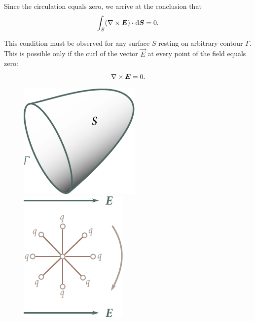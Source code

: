 \noindent
Since the circulation equals zero, we arrive at the conclusion that
\begin{equation*}
	\int_S (\nabla\times\boldsymbol{E}) \boldsymbol{\cdot} \mathrm{d}\boldsymbol{S} = 0.
\end{equation*}

\noindent
This condition must be observed for any surface $S$ resting on arbitrary contour $\Gamma$. This is possible only if the curl of the vector $\vec{E}$ at every point of the field equals zero:
\begin{equation}\label{eq:1_112}
	\nabla\times\boldsymbol{E} = 0.
\end{equation}

\begin{figure}[t]
	\begin{minipage}[t]{0.5\linewidth}
		\begin{center}
			\includegraphics[scale=1]{figures/ch_01/fig_1_32.pdf}
			\caption[]{}
			\label{fig:1_32}
		\end{center}
	\end{minipage}
	\hspace{-0.1cm}
	\begin{minipage}[t]{0.5\linewidth}
		\begin{center}
			\includegraphics[scale=1]{figures/ch_01/fig_1_33.pdf}
			\caption[]{}
			\label{fig:1_33}
		\end{center}
	\end{minipage}
\vspace{-0.4cm}
\end{figure}

